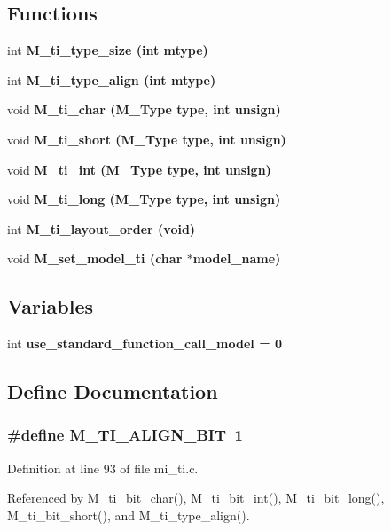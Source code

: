 \subsection*{Functions}
\begin{CompactItemize}
\item 
int \bf{M\_\-ti\_\-type\_\-size} (int mtype)
\item 
int \bf{M\_\-ti\_\-type\_\-align} (int mtype)
\item 
void \bf{M\_\-ti\_\-char} (\bf{M\_\-Type} type, int unsign)
\item 
void \bf{M\_\-ti\_\-short} (\bf{M\_\-Type} type, int unsign)
\item 
void \bf{M\_\-ti\_\-int} (\bf{M\_\-Type} type, int unsign)
\item 
void \bf{M\_\-ti\_\-long} (\bf{M\_\-Type} type, int unsign)
\item 
int \bf{M\_\-ti\_\-layout\_\-order} (void)
\item 
void \bf{M\_\-set\_\-model\_\-ti} (char $\ast$model\_\-name)
\end{CompactItemize}
\subsection*{Variables}
\begin{CompactItemize}
\item 
int \bf{use\_\-standard\_\-function\_\-call\_\-model} = 0
\end{CompactItemize}


\subsection{Define Documentation}
\subsubsection{\setlength{\rightskip}{0pt plus 5cm}\#define M\_\-TI\_\-ALIGN\_\-BIT~1}\label{mi__ti_8c_001e2a727e21de44184b09d152b9adad}




Definition at line 93 of file mi\_\-ti.c.

Referenced by M\_\-ti\_\-bit\_\-char(), M\_\-ti\_\-bit\_\-int(), M\_\-ti\_\-bit\_\-long(), M\_\-ti\_\-bit\_\-short(), and M\_\-ti\_\-type\_\-align().
